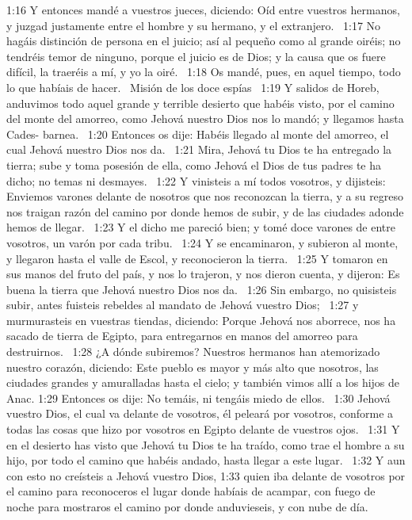 1:16 Y entonces mandé a vuestros jueces, diciendo: Oíd entre vuestros hermanos, y juzgad justamente entre el hombre y su hermano, y el extranjero.  
1:17 No hagáis distinción de persona en el juicio; así al pequeño como al grande oiréis; no tendréis temor de ninguno, porque el juicio es de Dios; y la causa que os fuere difícil, la traeréis a mí, y yo la oiré.  
1:18 Os mandé, pues, en aquel tiempo, todo lo que habíais de hacer.  
Misión de los doce espías   
1:19 Y salidos de Horeb, anduvimos todo aquel grande y terrible desierto que habéis visto, por el camino del monte del amorreo, como Jehová nuestro Dios nos lo mandó; y llegamos hasta Cades- barnea.  
1:20 Entonces os dije: Habéis llegado al monte del amorreo, el cual Jehová nuestro Dios nos da.  
1:21 Mira, Jehová tu Dios te ha entregado la tierra; sube y toma posesión de ella, como Jehová el Dios de tus padres te ha dicho; no temas ni desmayes.  
1:22 Y vinisteis a mí todos vosotros, y dijisteis: Enviemos varones delante de nosotros que nos reconozcan la tierra, y a su regreso nos traigan razón del camino por donde hemos de subir, y de las ciudades adonde hemos de llegar.  
1:23 Y el dicho me pareció bien; y tomé doce varones de entre vosotros, un varón por cada tribu.  
1:24 Y se encaminaron, y subieron al monte, y llegaron hasta el valle de Escol, y reconocieron la tierra.  
1:25 Y tomaron en sus manos del fruto del país, y nos lo trajeron, y nos dieron cuenta, y dijeron: Es buena la tierra que Jehová nuestro Dios nos da.  
1:26 Sin embargo, no quisisteis subir, antes fuisteis rebeldes al mandato de Jehová vuestro Dios;  
1:27 y murmurasteis en vuestras tiendas, diciendo: Porque Jehová nos aborrece, nos ha sacado de tierra de Egipto, para entregarnos en manos del amorreo para destruirnos.  
1:28 ¿A dónde subiremos? Nuestros hermanos han atemorizado nuestro corazón, diciendo: Este pueblo es mayor y más alto que nosotros, las ciudades grandes y amuralladas hasta el cielo; y también vimos allí a los hijos de Anac. 
1:29 Entonces os dije: No temáis, ni tengáis miedo de ellos.  
1:30 Jehová vuestro Dios, el cual va delante de vosotros, él peleará por vosotros, conforme a todas las cosas que hizo por vosotros en Egipto delante de vuestros ojos.  
1:31 Y en el desierto has visto que Jehová tu Dios te ha traído, como trae el hombre a su hijo, por todo el camino que habéis andado, hasta llegar a este lugar.  
1:32 Y aun con esto no creísteis a Jehová vuestro Dios, 
1:33 quien iba delante de vosotros por el camino para reconoceros el lugar donde habíais de acampar, con fuego de noche para mostraros el camino por donde anduvieseis, y con nube de día.  
